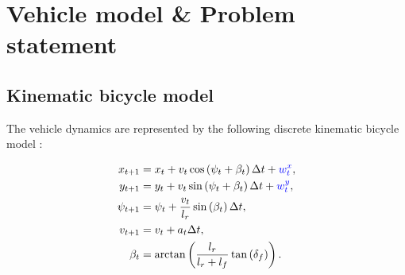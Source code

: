 \documentclass[10pt,journal]{IEEEtran}
\begin{document}
	
	
	
	
	
	
	\section{Vehicle model \& Problem statement}
	\label{sec:model}
	\subsection{Kinematic bicycle model}
	The  vehicle dynamics are represented by the following discrete kinematic bicycle model \cite{Kong2015}:
	
	\begin{subequations}
		\begin{align}
		x_{t+1} & = x_t + v_t \cos\left(\psi_t + \beta_t \right) \Delta t + \textcolor{blue}{w^x_t}, \\ 
		y_{t+1} & = y_t + v_t \sin\left(\psi_t + \beta_t \right) \Delta t + \textcolor{blue}{w^y_t}, \\ 
		\psi_{t+1} & = 	\psi_t + \frac{v_t}{l_r} \sin\left( \beta_t \right) \Delta t, \\ 
		v_{t+1} & =	v_t + a_t \Delta t, \\
		\beta_t & = \arctan\left(\frac{l_r}{l_r+l_f}\tan\left(\delta_f\right)\right).
		\end{align}
		\label{eq:mod}
	\end{subequations}
	
\end{document}
